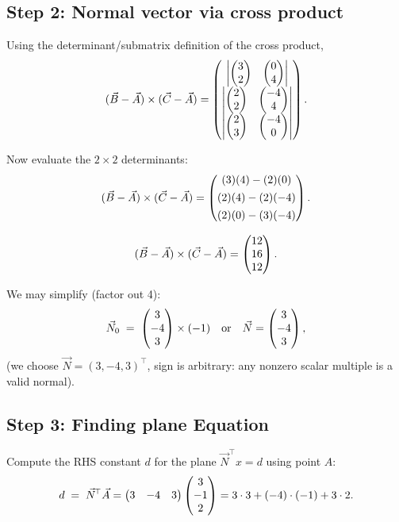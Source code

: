 \documentclass[12pt]{article}
\begin{document}
\subsection*{Step 2: Normal vector via cross product}
Using the determinant/submatrix definition of the cross product,
\begin{equation}
(\Vec{B}-\Vec{A}) \times (\Vec{C}-\Vec{A})
= \begin{pmatrix}
  \begin{vmatrix}\begin{pmatrix}3\\2\end{pmatrix} & \begin{pmatrix}0\\4\end{pmatrix}\end{vmatrix} \\[1ex]
  \begin{vmatrix}\begin{pmatrix}2\\2\end{pmatrix} & \begin{pmatrix}-4\\4\end{pmatrix}\end{vmatrix} \\[1ex]
  \begin{vmatrix}\begin{pmatrix}2\\3\end{pmatrix} & \begin{pmatrix}-4\\0\end{pmatrix}\end{vmatrix}
\end{pmatrix}.
\end{equation}

Now evaluate the $2\times2$ determinants:
\begin{equation}
(\Vec{B}-\Vec{A}) \times (\Vec{C}-\Vec{A})
= \begin{pmatrix} (3)(4) - (2)(0) \\[4pt] (2)(4) - (2)(-4) \\[4pt] (2)(0) - (3)(-4) \end{pmatrix}.
\end{equation}

\begin{equation}
(\Vec{B}-\Vec{A}) \times (\Vec{C}-\Vec{A})
= \begin{pmatrix}12 \\ 16 \\ 12\end{pmatrix}.
\end{equation}

We may simplify (factor out 4):
\begin{equation}
\Vec{N}_0 \;=\; \begin{pmatrix}3 \\ -4 \\ 3\end{pmatrix} \times (-1) \quad\text{or}\quad
\Vec{N} = \begin{pmatrix}3 \\ -4 \\ 3\end{pmatrix},
\end{equation}
(we choose $\Vec{N}=(3,-4,3)^\top$, sign is arbitrary: any nonzero scalar multiple is a valid normal).

\subsection*{Step 3: Finding plane Equation}
Compute the RHS constant $d$ for the plane $\Vec{N}^{\!\top} x = d$ using point $A$:
\begin{equation}
d \;=\; \Vec{N}^{\!\top}\Vec{A}
= \begin{pmatrix}3 & -4 & 3\end{pmatrix}\begin{pmatrix}3\\-1\\2\end{pmatrix}
= 3\cdot 3 + (-4)\cdot(-1) + 3\cdot 2.
\end{equation}
\end{document}

